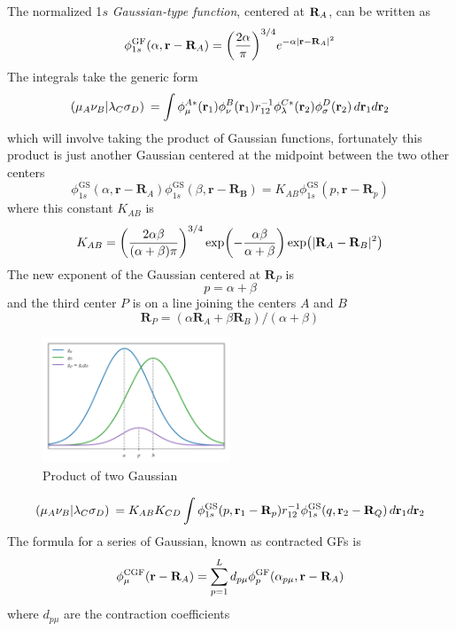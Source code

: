\documentclass[11pt]{article}
\begin{document}
The normalized 1$s$ \textit{Gaussian-type function}, centered at $\textbf{R}_A$, can be written as 
\begin{equation}\label{key}
\phi_{1s}^{\mathrm{GF}} (\alpha, \textbf{r} - \textbf{R}_A) = \qty(\frac{2\alpha}{\pi})^{3/4}e^{-\alpha|\textbf{r} - \textbf{R}_A|^2} 
\end{equation}
The integrals take the generic form 
\begin{equation}\label{}
\left(\mu_A \nu_B\middle|\lambda_C \sigma_D\right)\:= \int \phi_\mu^{A*}(\textbf{r}_1) \phi_\nu^{B}(\textbf{r}_1) r_{12}^{-1} \phi_\lambda^{C*} (\textbf{r}_2) \phi_\sigma^D (\textbf{r}_2) \dd{\textbf{r}_1 d\textbf{r}_2} 
\end{equation}
which will involve taking the product of Gaussian functions, fortunately this product is just another Gaussian centered at the midpoint between the two other centers
\begin{equation}
\phi_{1s}^{\mathrm{GS}}(\alpha, \mathbf{r} - \mathbf{R}_A) \phi_{1s}^{\mathrm{GS}}(\beta, \mathbf{r} - \mathbf{R_B}) = K_{AB} \phi_{1s}^{\mathrm{GS}}(p, \mathbf{r}- \mathbf{R}_p)
\end{equation}
where this constant $K_{AB}$ is 
\begin{equation}\label{}
K_{AB} = \qty(\frac{2\alpha\beta}{(\alpha + \beta) \pi})^{3/4} \exp(-\frac{\alpha\beta}{\alpha + \beta}) \exp(|\mathbf{R}_A - \mathbf{R}_B|^2)
\end{equation}
The new exponent of the Gaussian centered at $\mathbf{R}_P$ is 
\begin{equation}\label{}
p = \alpha + \beta 
\end{equation}
and the third center $P$ is on a line joining the centers $A$ and $B$
\begin{equation}\label{key}
\mathbf{R}_P = (\alpha \mathbf{R}_A + \beta \mathbf{R}_B)/(\alpha + \beta) 
\end{equation}
\begin{figure}[H]
	\centering
	\includegraphics[width=0.5\textwidth]{gauss_overlaps}
	\caption{Product of two Gaussian} 
\end{figure}
\begin{equation}\label{}
\left(\mu_A \nu_B\middle|\lambda_C \sigma_D\right)\:= K_{AB} K_{CD} \int \phi_{1s}^{\mathrm{GS}}(p, \mathbf{r}_1 - \textbf{R}_p)r_{12}^{-1} \phi_{1s}^{\mathrm{GS}}(q, \textbf{r}_2 - \textbf{R}_Q) \dd{\textbf{r}_1 d\textbf{r}_2} 
\end{equation}
The formula for a series of Gaussian, known as contracted GFs is
\begin{equation}\label{key}
\phi_\mu^{\mathrm{CGF}}(\textbf{r} - \textbf{R}_A) = \sum_{p = 1}^L d_{p\mu} \phi_p^{\mathrm{GF}}(\alpha_{p\mu}, \textbf{r} - \textbf{R}_A) 
\end{equation}
where $d_{p\mu}$ are the contraction coefficients
\end{document}
